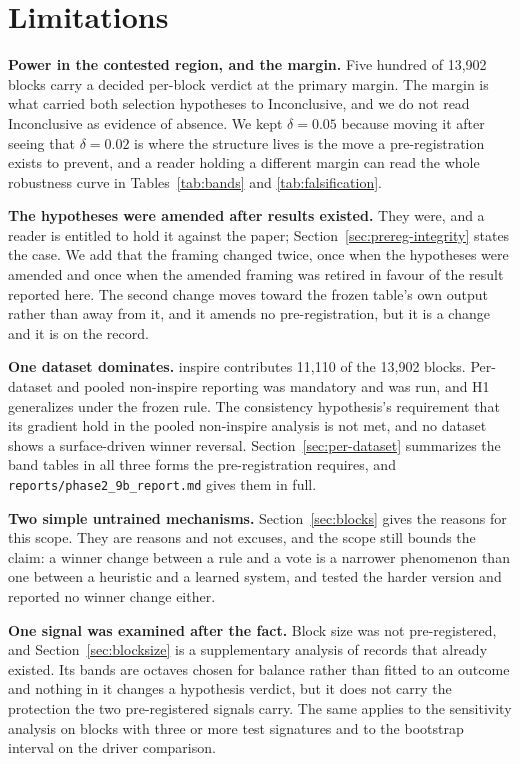 \documentclass[11pt]{article}
\begin{document}
\section{Limitations}
\label{sec:limitations}

\textbf{Power in the contested region, and the margin.} Five hundred of
13{,}902 blocks carry a decided per-block verdict at the primary margin. The
margin is what carried both selection hypotheses to Inconclusive, and we do
not read Inconclusive as evidence of absence. We kept $\delta = 0.05$ because
moving it after seeing that $\delta = 0.02$ is where the structure lives is
the move a pre-registration exists to prevent, and a reader holding a
different margin can read the whole robustness curve in
Tables~\ref{tab:bands} and \ref{tab:falsification}.

\textbf{The hypotheses were amended after results existed.} They were, and a
reader is entitled to hold it against the paper;
Section~\ref{sec:prereg-integrity} states the case. We add that the framing
changed twice, once when the hypotheses were amended and once when the amended
framing was retired in favour of the result reported here. The second change
moves toward the frozen table's own output rather than away from it, and it
amends no pre-registration, but it is a change and it is on the record.

\textbf{One dataset dominates.} inspire contributes 11{,}110 of the 13{,}902
blocks. Per-dataset and pooled non-inspire reporting was mandatory and was
run, and H1 generalizes under the frozen rule. The consistency hypothesis's
requirement that its gradient hold in the pooled non-inspire analysis is not
met, and no dataset shows a surface-driven winner reversal.
Section~\ref{sec:per-dataset} summarizes the band tables in all three forms the pre-registration requires, and \texttt{reports/phase2\_9b\_report.md} gives them in full.

\textbf{Two simple untrained mechanisms.} Section~\ref{sec:blocks} gives the
reasons for this scope. They are reasons and not excuses, and the scope still
bounds the claim: a winner change between a rule and a vote is a narrower
phenomenon than one between a heuristic and a learned system, and
\citeauthor{kimkim2020} tested the harder version and reported no winner
change either.

\textbf{One signal was examined after the fact.} Block size was not
pre-registered, and Section~\ref{sec:blocksize} is a supplementary analysis of
records that already existed. Its bands are octaves chosen for balance rather
than fitted to an outcome and nothing in it changes a hypothesis verdict, but
it does not carry the protection the two pre-registered signals carry. The
same applies to the sensitivity analysis on blocks with three or more test
signatures and to the bootstrap interval on the driver comparison.
\end{document}
